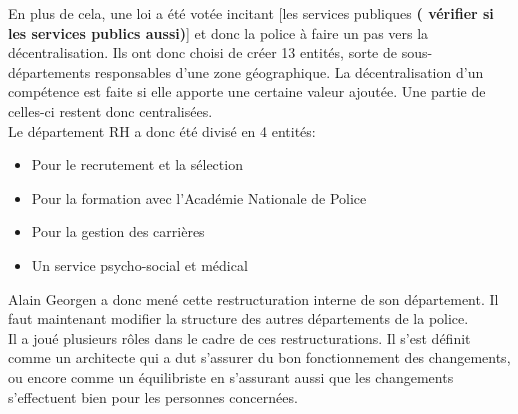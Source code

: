 En plus de cela, une loi a été votée incitant [les services publiques \textbf{( vérifier si les services publics aussi)}] et donc la police à faire un pas vers la décentralisation. Ils ont donc choisi de créer 13 entités, sorte de sous-départements responsables d'une zone géographique. La décentralisation d'un compétence est faite si elle apporte une certaine valeur ajoutée. Une partie de celles-ci restent donc centralisées.\\

Le département RH a donc été divisé en 4 entités:
\begin{itemize}
	\item Pour le recrutement et la sélection
	\item Pour la formation avec l'Académie Nationale de Police
	\item Pour la gestion des carrières
	\item Un service psycho-social et médical
\end{itemize}

Alain Georgen a donc mené cette restructuration interne de son département. Il faut maintenant modifier la structure des autres départements de la police.\\

Il a joué plusieurs rôles dans le cadre de ces restructurations. Il s'est définit comme un architecte qui a dut s'assurer du bon fonctionnement des changements, ou encore comme un équilibriste en s'assurant aussi que les changements s'effectuent bien pour les personnes concernées.



